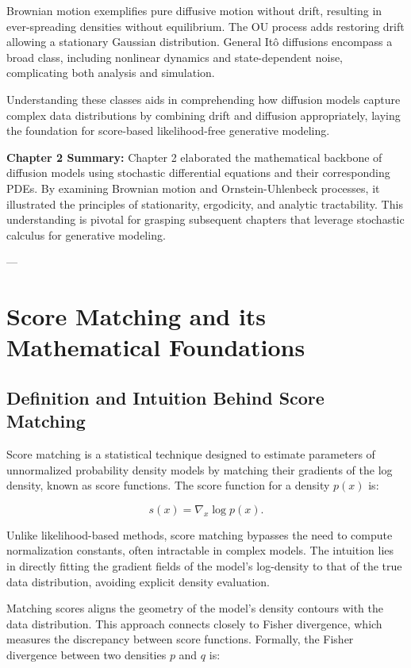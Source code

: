 Brownian motion exemplifies pure diffusive motion without drift, resulting in ever-spreading densities without equilibrium. The OU process adds restoring drift allowing a stationary Gaussian distribution. General Itô diffusions encompass a broad class, including nonlinear dynamics and state-dependent noise, complicating both analysis and simulation.

Understanding these classes aids in comprehending how diffusion models capture complex data distributions by combining drift and diffusion appropriately, laying the foundation for score-based likelihood-free generative modeling.

\textbf{Chapter 2 Summary:}  
Chapter 2 elaborated the mathematical backbone of diffusion models using stochastic differential equations and their corresponding PDEs. By examining Brownian motion and Ornstein-Uhlenbeck processes, it illustrated the principles of stationarity, ergodicity, and analytic tractability. This understanding is pivotal for grasping subsequent chapters that leverage stochastic calculus for generative modeling.

---

\chapter{Score Matching and its Mathematical Foundations}

\section{Definition and Intuition Behind Score Matching}

Score matching is a statistical technique designed to estimate parameters of unnormalized probability density models by matching their gradients of the log density, known as score functions. The score function for a density \( p(x) \) is:

\[
s(x) = \nabla_x \log p(x).
\]

Unlike likelihood-based methods, score matching bypasses the need to compute normalization constants, often intractable in complex models. The intuition lies in directly fitting the gradient fields of the model's log-density to that of the true data distribution, avoiding explicit density evaluation.

Matching scores aligns the geometry of the model's density contours with the data distribution. This approach connects closely to Fisher divergence, which measures the discrepancy between score functions. Formally, the Fisher divergence between two densities \( p \) and \( q \) is:

